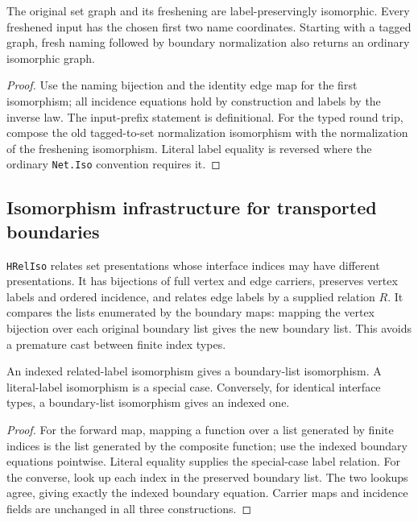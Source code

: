 \begin{lemma}
The original set graph and its freshening are label-preservingly isomorphic.
Every freshened input has the chosen first two name coordinates. Starting with
a tagged graph, fresh naming followed by boundary normalization also returns an
ordinary isomorphic graph.
\end{lemma}
\begin{proof}
Use the naming bijection and the identity edge map for the first isomorphism;
all incidence equations hold by construction and labels by the inverse law.
The input-prefix statement is definitional. For the typed round trip, compose
the old tagged-to-set normalization isomorphism with the normalization of the
freshening isomorphism. Literal label equality is reversed where the ordinary
\texttt{Net.Iso} convention requires it.
\end{proof}



\subsection{Isomorphism infrastructure for transported boundaries}
\begin{definition}
\texttt{HRelIso} relates set presentations whose interface indices may have
different presentations. It has bijections of full vertex and edge carriers,
preserves vertex labels and ordered incidence, and relates edge labels by a
supplied relation $R$. It compares the lists enumerated by the boundary maps:
mapping the vertex bijection over each original boundary list gives the new
boundary list. This avoids a premature cast between finite index types.
\end{definition}

\begin{lemma}
An indexed related-label isomorphism gives a boundary-list isomorphism. A
literal-label isomorphism is a special case. Conversely, for identical interface
types, a boundary-list isomorphism gives an indexed one.
\end{lemma}
\begin{proof}
For the forward map, mapping a function over a list generated by finite indices
is the list generated by the composite function; use the indexed boundary
equations pointwise. Literal equality supplies the special-case label relation.
For the converse, look up each index in the preserved boundary list. The two
lookups agree, giving exactly the indexed boundary equation. Carrier maps and
incidence fields are unchanged in all three constructions.
\end{proof}

